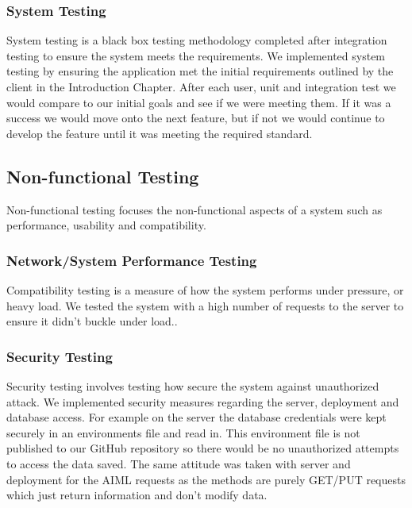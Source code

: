 \subsubsection{System Testing}
System testing is a black box testing methodology completed after integration testing to ensure the system meets the requirements. We implemented system testing by ensuring the application met the initial requirements outlined by the client in the Introduction Chapter. After each user, unit and integration test we would compare to our initial goals and see if we were meeting them. If it was a success we would move onto the next feature, but if not we would continue to develop the feature until it was meeting the required standard.

\subsection{Non-functional Testing}
Non-functional testing focuses the non-functional aspects of a system such as performance, usability and compatibility.

\subsubsection{Network/System Performance Testing}
Compatibility testing is a measure of how the system performs under pressure, or heavy load. We tested the system with a high number of requests to the server to ensure it didn't buckle under load..  



\subsubsection{Security Testing}
Security testing involves testing how secure the system against unauthorized attack. We implemented security measures regarding the server, deployment and database access. For example on the server the database credentials were kept securely in an environments file and read in. This environment file is not published to our GitHub repository so there would be no unauthorized attempts to access the data saved. The same attitude was taken with server and deployment for the AIML requests as the methods are purely GET/PUT requests which just return information and don't modify data.

